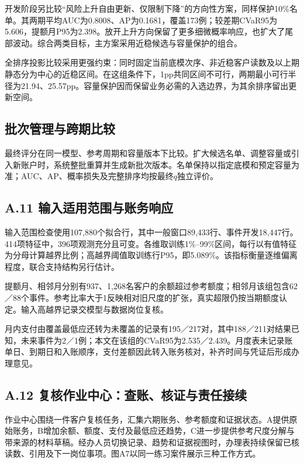 开发阶段另比较“风险上升自由更新、仅限制下降”的方向性方案，同样保护10\%名单。其两期平均AUC为0.8008、AP为0.1681，覆盖173例；较差期CVaR95为5.606，提额月P95为2.398。放开上升方向保留了更多细微概率响应，也扩大了尾部波动。综合两类目标，主方案采用近稳候选与容量保护的组合。

全排序投影比较采用更强约束：同时固定当前底模次序、非近稳客户读数及以上期静态分为中心的近稳区间。在这组条件下，1pp共同区间不可行，两期最小可行半径为21.94、25.57pp。容量保护因而保留业务必需的入选边界，为其余排序留出更新空间。

\subsection*{批次管理与跨期比较}
最终评分在同一模型、参考周期和容量版本下比较。扩大候选名单、调整容量或引入新账户时，系统整批重算并生成新批次版本。名单保持以指定底模和预定容量为准；AUC、AP、概率损失及完整排序均按最终$q$独立评价。

\clearpage\subsection*{A.11 输入适用范围与账务响应}
输入范围检查使用107,880个拟合行，其中一般窗口89,433行、事件开发18,447行。414项特征中，396项观测充分且可变。各维取训练1\%--99\%区间，每行以有值特征为分母计算越界比例；高越界阈值取训练行P95，即5.089\%。该指标衡量逐维偏离程度，联合支持结构另行估计。


提额月、相邻月分别有937、1,268名客户的余额超过参考额度；相邻月该组包含62／88个事件。参考比率大于1反映相对旧尺度的扩张，真实超限仍按当期额度认定。输入高越界记录交模型与数据岗位复核。

月内支付由覆盖最低应还转为未覆盖的记录有195／217对，其中188／211对结果已知，未来事件为2／1例；本文在该组的CVaR95为2.535／2.439。月度表未记录账单日、到期日和入账顺序，支付差额因此转入账务核对，补齐时间与凭证后形成办理意见。
\clearpage\subsection*{A.12 复核作业中心：查账、核证与责任接续}
作业中心围绕一件客户复核任务，汇集六期账务、参考额度和证据状态。A提供原始账务，B增加余额、额度、支付及最低应还趋势，C进一步提供参考尺度分解与带来源的材料草稿。经办人员切换记录、趋势和证据视图时，办理表持续保留已核读数、引用及下一岗位事项。图A7以同一练习案件展示三种工作方式。

